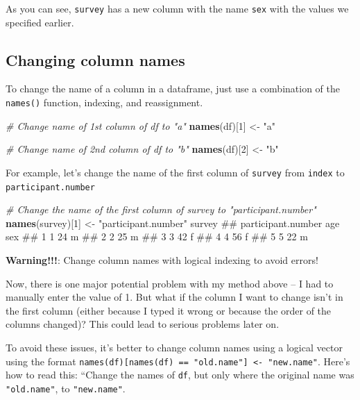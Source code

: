 \documentclass[]{book}
\newenvironment{Shaded}{\begin{snugshade}}{\end{snugshade}}
\newcommand{\KeywordTok}[1]{\textcolor[rgb]{0.13,0.29,0.53}{\textbf{{#1}}}}
\newcommand{\DecValTok}[1]{\textcolor[rgb]{0.00,0.00,0.81}{{#1}}}
\newcommand{\StringTok}[1]{\textcolor[rgb]{0.31,0.60,0.02}{{#1}}}
\newcommand{\CommentTok}[1]{\textcolor[rgb]{0.56,0.35,0.01}{\textit{{#1}}}}
\newcommand{\NormalTok}[1]{{#1}}
\theoremstyle{definition}
\theoremstyle{definition}
\theoremstyle{remark}
\begin{document}
As you can see, \texttt{survey} has a new column with the name
\texttt{sex} with the values we specified earlier.

\subsection{Changing column names}\label{changing-column-names}

To change the name of a column in a dataframe, just use a combination of
the \texttt{names()} function, indexing, and reassignment.

\begin{Shaded}
\begin{Highlighting}[]
\CommentTok{# Change name of 1st column of df to "a"}
\KeywordTok{names}\NormalTok{(df)[}\DecValTok{1}\NormalTok{] <-}\StringTok{ "a"}

\CommentTok{# Change name of 2nd column of df to "b"}
\KeywordTok{names}\NormalTok{(df)[}\DecValTok{2}\NormalTok{] <-}\StringTok{ "b"}
\end{Highlighting}
\end{Shaded}

For example, let's change the name of the first column of
\texttt{survey} from \texttt{index} to \texttt{participant.number}

\begin{Shaded}
\begin{Highlighting}[]
\CommentTok{# Change the name of the first column of survey to "participant.number"}
\KeywordTok{names}\NormalTok{(survey)[}\DecValTok{1}\NormalTok{] <-}\StringTok{ "participant.number"}
\NormalTok{survey}
\NormalTok{##   participant.number age sex}
\NormalTok{## 1                  1  24   m}
\NormalTok{## 2                  2  25   m}
\NormalTok{## 3                  3  42   f}
\NormalTok{## 4                  4  56   f}
\NormalTok{## 5                  5  22   m}
\end{Highlighting}
\end{Shaded}

\textbf{Warning!!!}: Change column names with logical indexing to avoid
errors!

Now, there is one major potential problem with my method above -- I had
to manually enter the value of 1. But what if the column I want to
change isn't in the first column (either because I typed it wrong or
because the order of the columns changed)? This could lead to serious
problems later on.

To avoid these issues, it's better to change column names using a
logical vector using the format
\texttt{names(df){[}names(df)\ ==\ "old.name"{]}\ \textless{}-\ "new.name"}.
Here's how to read this: ``Change the names of \texttt{df}, but only
where the original name was \texttt{"old.name"}, to \texttt{"new.name"}.
\end{document}
